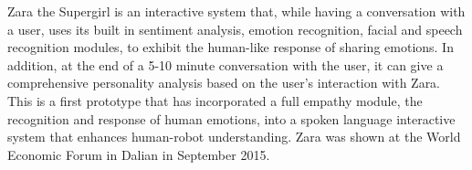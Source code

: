Zara the Supergirl is an interactive system that, while having a conversation with a user, uses its built in sentiment analysis, emotion recognition, facial and speech recognition modules, to exhibit the human-like response of sharing emotions. In addition, at the end of a 5-10 minute conversation with the user, it can give a comprehensive personality analysis based on the user's interaction with Zara. This is a first prototype that has incorporated a full empathy module, the recognition and response of human emotions, into a spoken language interactive system that enhances human-robot understanding. Zara was shown at the World Economic Forum in Dalian in September 2015.
